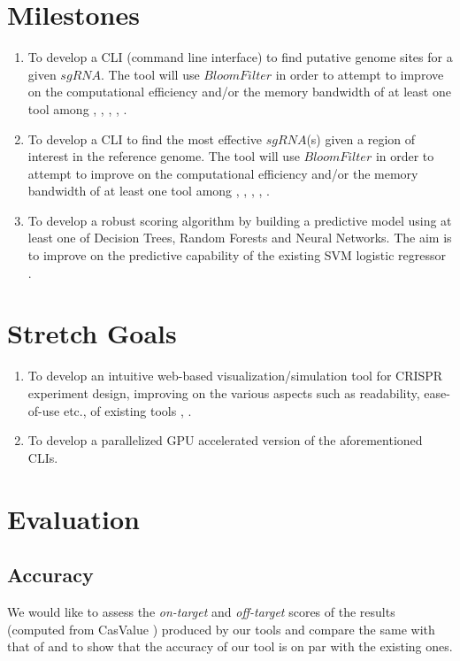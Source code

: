 \documentclass[12pt]{article}
\begin{document}
\section*{Milestones}
\begin{enumerate}
	\item To develop a CLI (command line interface) to find putative genome sites for a given $sgRNA$. The tool will use $Bloom Filter$ in order to attempt to improve on the computational efficiency and/or the memory bandwidth of at least one tool among \cite{chopchop}, \cite{crispor}, \cite{flash-fry}, \cite{casfinder-casvalue}, \cite{cassoffinder}.
    \item To develop a CLI to find the most effective $sgRNA$(s) given a region of interest in the reference genome. The tool will use $Bloom Filter$ in order to attempt to improve on the computational efficiency and/or the memory bandwidth of at least one tool among \cite{chopchop}, \cite{crispor}, \cite{flash-fry}, \cite{casfinder-casvalue}, \cite{cassoffinder}.
    \item To develop a robust scoring algorithm by building a predictive model using at least one of Decision Trees, Random Forests and Neural Networks. The aim is to improve on the predictive capability of the existing SVM logistic regressor \cite{rational-design}.
\end{enumerate}

\section*{Stretch Goals}
\begin{enumerate}
	\item To develop an intuitive web-based visualization/simulation tool for CRISPR experiment design, improving on the various aspects such as readability, ease-of-use etc., of existing tools \cite{chopchop}, \cite{genome-browser}.
    \item To develop a parallelized GPU accelerated version of the aforementioned CLIs.
\end{enumerate}

\section*{Evaluation}
	\subsection*{Accuracy}
    We would like to assess the \textit{on-target} and \textit{off-target} scores of the results (computed from CasValue \cite{casfinder-casvalue}) produced by our tools and compare the same with that of \cite{chopchop} and \cite{casfinder-casvalue} to show that the accuracy of our tool is on par with the existing ones.
\end{document}
